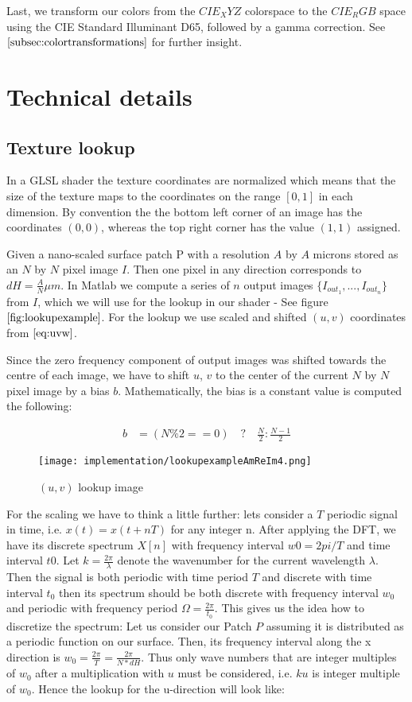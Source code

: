 Last, we transform our colors from the $CIE_XYZ$ colorspace to the $CIE_RGB$ space using the CIE Standard Illuminant D65, followed by a gamma correction. See $\ref{subsec:colortransformations}$ for further insight.

\section{Technical details}
\subsection{Texture lookup}
In a GLSL shader the texture coordinates are normalized which means that the size of the texture maps to the coordinates on the range $[0,1]$ in each dimension. By convention the the bottom left corner of an image has the coordinates $(0,0)$, whereas the top right corner has the value $(1,1)$ assigned. 

Given a nano-scaled surface patch P with a resolution $A$ by $A$ microns stored as an $N$ by $N$ pixel image $I$.
Then one pixel in any direction corresponds to $dH = \frac{A}{N} \mu m$. 
In Matlab we compute a series of $n$ output images $\{I_{out_1},...,I_{out_n}\}$ from $I$, which we will use for the lookup in our shader - See figure $\ref{fig:lookupexample}$. For the lookup we use scaled and shifted $(u,v)$ coordinates from $\ref{eq:uvw}$. 

Since the zero frequency component of output images was shifted towards the centre of each image, we have to shift $u$, $v$ to the center of the current $N$ by $N$ pixel image by a bias $b$. Mathematically, the bias is a constant value is computed the following:

\begin{align}
    b
    &= (N \% 2 == 0) \quad ? \quad \frac{N}{2} : \frac{N-1}{2}
\label{eq:bias}
\end{align}

\begin{figure}[H]
  \centering
  \texttt{[image: implementation/lookupexampleAmReIm4.png]}
  \caption[Lookup in DFT Terms]{$(u,v)$ lookup image}
\label{fig:lookupexample}
\end{figure}

For the scaling we have to think a little further: lets consider a $T$ periodic signal in time, i.e. $x(t) = x(t+nT)$ for any integer n. After applying the DFT, we have its discrete spectrum $X[n]$ with frequency interval $w0 = 2pi / T$ and time interval $t0$. Let $k = \frac{2 \pi}{\lambda}$ denote the wavenumber for the current wavelength $\lambda$.
Then the signal is both periodic with time period $T$ and discrete with time interval $t_0$ then its spectrum should be both discrete with frequency interval $w_0$ and periodic with frequency period $\Omega = \frac{2 \pi}{t_0}$. This gives us the idea how to discretize the spectrum: Let us consider our Patch $P$ assuming it is distributed as a periodic function on our surface. Then, its frequency interval along the x direction is $w_0 = \frac{2 \pi}{T} = \frac{2 \pi}{N*dH}$. 
Thus only wave numbers that are integer multiples of $w_0$ after a multiplication with $u$ must be considered, i.e. $ku$ is integer multiple of $w_0$. Hence the lookup for the u-direction will look like:

